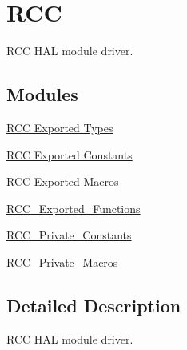\hypertarget{group___r_c_c}{}\section{R\+CC}
\label{group___r_c_c}


R\+CC H\+AL module driver.  


\subsection*{Modules}
\begin{DoxyCompactItemize}
\item 
\hyperlink{group___r_c_c___exported___types}{R\+C\+C Exported Types}
\item 
\hyperlink{group___r_c_c___exported___constants}{R\+C\+C Exported Constants}
\item 
\hyperlink{group___r_c_c___exported___macros}{R\+C\+C Exported Macros}
\item 
\hyperlink{group___r_c_c___exported___functions}{R\+C\+C\+\_\+\+Exported\+\_\+\+Functions}
\item 
\hyperlink{group___r_c_c___private___constants}{R\+C\+C\+\_\+\+Private\+\_\+\+Constants}
\item 
\hyperlink{group___r_c_c___private___macros}{R\+C\+C\+\_\+\+Private\+\_\+\+Macros}
\end{DoxyCompactItemize}


\subsection{Detailed Description}
R\+CC H\+AL module driver. 


